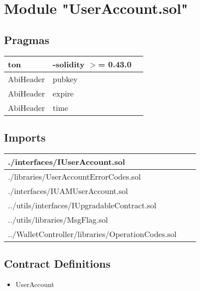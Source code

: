 
\section{Module "UserAccount.sol"}


\subsection{Pragmas}


\noindent\begin{tabular}{|l|l|p{5cm}|}\hline
ton & -solidity $>$= 0.43.0 &\\\hline
AbiHeader &  pubkey &\\\hline
AbiHeader &  expire &\\\hline
AbiHeader &  time &\\\hline
\end{tabular}


\subsection{Imports}


\noindent\begin{tabular}{|l|l|p{5cm}|}\hline
./interfaces/IUserAccount.sol &\\\hline
./libraries/UserAccountErrorCodes.sol &\\\hline
./interfaces/IUAMUserAccount.sol &\\\hline
../utils/interfaces/IUpgradableContract.sol &\\\hline
../utils/libraries/MsgFlag.sol &\\\hline
../WalletController/libraries/OperationCodes.sol &\\\hline
\end{tabular}


\subsection{Contract Definitions}

\begin{itemize}
\item UserAccount
\end{itemize}
